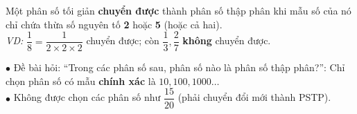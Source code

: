 \documentclass[14pt,a4paper,oneside]{extbook}
\begin{document}
\noindent
\begin{minipage}[t]{0.54\textwidth}
  \begin{tcolorbox}[
    enhanced,
    title={\footnotesize\bfseries\color{white}\faLightbulbO\ Khi nào một phân số chuyển được?},
    colback=green!3!white,
    colframe=green!60!black,
    arc=2.5mm, boxrule=0.8pt, top=1.8mm, bottom=1.8mm, left=2.2mm, right=2.2mm
  ]
    \footnotesize
    Một phân số tối giản \textbf{chuyển được} thành phân số thập phân khi mẫu số của nó chỉ chứa thừa số nguyên tố \textbf{2} hoặc \textbf{5} (hoặc cả hai).\\
    \textit{VD:} $\dfrac{1}{8} = \dfrac{1}{2 \times 2 \times 2}$ chuyển được; còn $\dfrac{1}{3}, \dfrac{2}{7}$ \textbf{không} chuyển được.
  \end{tcolorbox}
\end{minipage}%
\hfill
\begin{minipage}[t]{0.44\textwidth}
  \begin{tcolorbox}[
    enhanced,
    title={\footnotesize\bfseries\color{white}\faExclamationTriangle\ Mẹo tránh bẫy trắc nghiệm},
    colback=red!2!white,
    colframe=red!70!black,
    arc=2.5mm, boxrule=0.8pt, top=1.8mm, bottom=1.8mm, left=2.2mm, right=2.2mm
  ]
    \footnotesize
    $\bullet$ Đề bài hỏi: ``Trong các phân số sau, phân số nào là phân số thập phân?'': Chỉ chọn phân số có mẫu \textbf{chính xác} là $10, 100, 1000\dots$\\
    $\bullet$ Không được chọn các phân số như $\dfrac{15}{20}$ (phải chuyển đổi mới thành PSTP).
  \end{tcolorbox}
\end{minipage}
\end{document}

